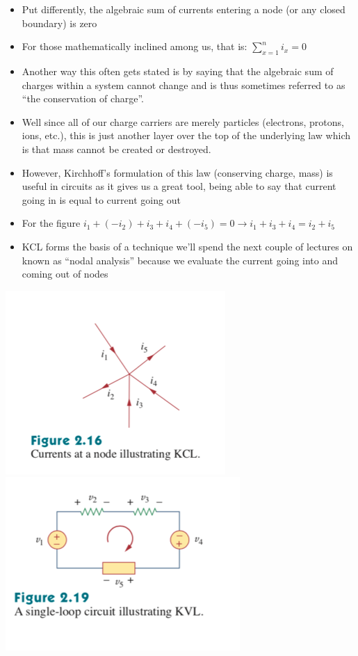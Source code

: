 \documentclass[11pt]{book}
\begin{document}
\begin{itemize}
	\item Put differently, the algebraic sum of currents entering a node (or any closed boundary) is zero
	\item For those mathematically inclined among us, that is: $\sum_{x=1}^n i_x = 0$
	\item Another way this often gets stated is by saying that the algebraic sum of charges within a system cannot change and is thus sometimes referred to as ``the conservation of charge''.
	\item Well since all of our charge carriers are merely particles (electrons, protons, ions, etc.), this is just another layer over the top of the underlying law which is that mass cannot be created or destroyed.
	\item However, Kirchhoff's formulation of this law (conserving charge, mass) is useful in circuits as it gives us a great tool, being able to say that current going in is equal to current going out
	\item For the figure $i_1 + (-i_2) + i_3 + i_4 + (-i_5) = 0 \rightarrow i_1 +i_3 + i_4 = i_2 + i_5$
	\item KCL forms the basis of a technique we’ll spend the next couple of lectures on known as “nodal analysis” because we evaluate the current going into and coming out of nodes
\end{itemize}

\includegraphics{figures/04.node.png}
\includegraphics{figures/04.single-loop-kvl.png}
\end{document}
